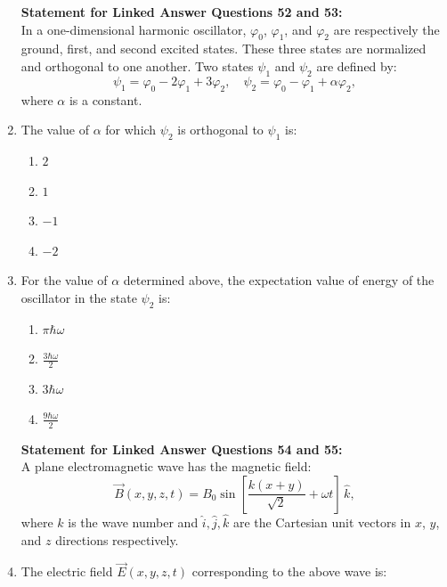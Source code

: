 \documentclass[journal,12pt,onecolumn]{IEEEtran}
\begin{document}
\begin{enumerate}
\newpage

\textbf{Statement for Linked Answer Questions 52 and 53:} \\
In a one-dimensional harmonic oscillator, $\varphi_{0}$, $\varphi_{1}$, and $\varphi_{2}$ are respectively the ground, first, and second excited states. These three states are normalized and orthogonal to one another. Two states $\psi_{1}$ and $\psi_{2}$ are defined by:
\[
\psi_{1} = \varphi_{0} - 2\varphi_{1} + 3\varphi_{2}, \quad
\psi_{2} = \varphi_{0} - \varphi_{1} + \alpha \varphi_{2},
\]
where $\alpha$ is a constant.


\item The value of $\alpha$ for which $\psi_{2}$ is orthogonal to $\psi_{1}$ is:

\hfill{}

\begin{multicols}{4}
\begin{enumerate}
\item $2$
\item $1$
\item $-1$
\item $-2$
\end{enumerate}
\end{multicols}

\item For the value of $\alpha$ determined above, the expectation value of energy of the oscillator in the state $\psi_{2}$ is:

\hfill{}

\begin{multicols}{4}
\begin{enumerate}
\item $\pi \hbar \omega$
\item $\frac{3\hbar\omega}{2}$
\item $3\hbar\omega$
\item $\frac{9\hbar\omega}{2}$
\end{enumerate}
\end{multicols}


\textbf{Statement for Linked Answer Questions 54 and 55:} \\
A plane electromagnetic wave has the magnetic field:
\[
\vec{B}(x,y,z,t) = B_{0} \sin\left[\frac{k(x+y)}{\sqrt{2}} + \omega t\right] \, \hat{k},
\]
where $k$ is the wave number and $\hat{i}, \hat{j}, \hat{k}$ are the Cartesian unit vectors in $x$, $y$, and $z$ directions respectively.


\item The electric field $\vec{E}(x,y,z,t)$ corresponding to the above wave is:


\end{enumerate}
\end{document}
